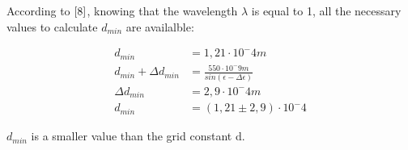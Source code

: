 According to $\ref{8}$, knowing that the wavelength $\lambda$ is equal to 1, all the necessary values to calculate 
$d_{min}$ are availalble:

\begin{align*}
  d_{min} & = 1,21 \cdot 10^-4 m \\
  d_{min} + \Delta d_{min} & = \frac{550 \cdot 10^-9 m}{sin(\epsilon - \Delta \epsilon)} \\
  \Delta d_{min} &= 2,9 \cdot 10^-4 m \\
  d_{min} & = (1,21 \pm 2,9) \cdot 10^-4
\end{align*}

$d_{min}$ is a smaller value than the grid constant d.

  \newpage
